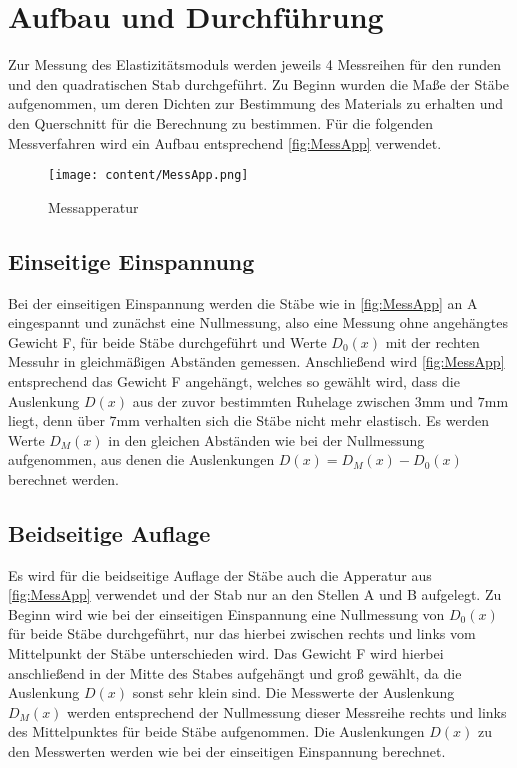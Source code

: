 \section{Aufbau und Durchführung}
\label{sec:Durchführung}
Zur Messung des Elastizitätsmoduls werden jeweils 4 Messreihen für den runden und den quadratischen Stab durchgeführt.
Zu Beginn wurden die Maße der Stäbe aufgenommen, um deren Dichten zur Bestimmung des Materials zu erhalten und den Querschnitt
für die Berechnung zu bestimmen. Für die folgenden Messverfahren wird ein Aufbau entsprechend \autoref{fig:MessApp} verwendet.
\begin{figure}[H]
    \centering
    \texttt{[image: content/MessApp.png]}
    \caption{Messapperatur}
    \label{fig:MessApp}
\end{figure}
\subsection{Einseitige Einspannung}
\label{subsec:EinseitigeEinspannungAuD}
Bei der einseitigen Einspannung werden die Stäbe wie in \autoref{fig:MessApp} an A eingespannt und zunächst eine Nullmessung, also
eine Messung ohne angehängtes Gewicht F, für beide Stäbe durchgeführt und Werte $D_0(x)$ mit der rechten Messuhr in gleichmäßigen Abständen gemessen.
Anschließend wird \autoref{fig:MessApp} entsprechend das Gewicht F angehängt, welches so gewählt wird, dass die Auslenkung $D(x)$
aus der zuvor bestimmten Ruhelage zwischen $3\unit{\milli\meter}$ und $7\unit{\milli\meter}$
liegt, denn über $7\unit{\milli\meter}$ verhalten sich die Stäbe nicht mehr elastisch. Es werden Werte $D_M(x)$ in den gleichen Abständen wie bei der Nullmessung aufgenommen,
aus denen die Auslenkungen $D(x) = D_M(x) - D_0(x)$ berechnet werden.
\subsection{Beidseitige Auflage}
\label{subsec:EinseitigeEinspannungAuD}
Es wird für die beidseitige Auflage der Stäbe auch die Apperatur aus \autoref{fig:MessApp} verwendet und der Stab nur an den Stellen A und B aufgelegt.
Zu Beginn wird wie bei der einseitigen Einspannung eine Nullmessung von $D_0(x)$ für beide Stäbe durchgeführt, nur das hierbei zwischen rechts und links vom
Mittelpunkt der Stäbe unterschieden wird. Das Gewicht F wird hierbei anschließend in der Mitte des Stabes aufgehängt und groß gewählt, da die Auslenkung $D(x)$
sonst sehr klein sind. Die Messwerte der Auslenkung $D_M(x)$ werden entsprechend der Nullmessung dieser Messreihe rechts und links des Mittelpunktes für beide
Stäbe aufgenommen. Die Auslenkungen $D(x)$ zu den Messwerten werden wie bei der einseitigen Einspannung berechnet.
